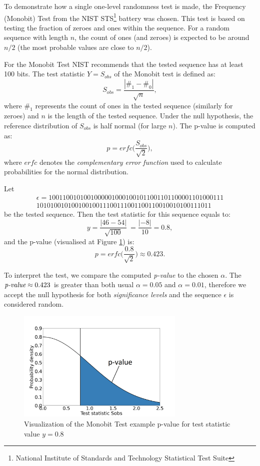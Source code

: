\documentclass[
  digital,     %
  oneside,     %
  nosansbold,  %
  nocolorbold, %
  nolof,         %
  nolot,         %
]{fithesis4}
\begin{document}
To demonstrate how a single one-level randomness test is made, the Frequency (Monobit) Test \cite[p. 2-2]{nist_special} from the NIST STS\footnote{National Institute of Standards and Technology Statistical Test Suite}  battery was chosen. This test is based on testing the fraction of zeroes and ones within the sequence. For a random sequence with length $n$, the count of ones (and zeroes) is expected to be around $n/2$ (the most probable values are close to $n/2$). 

For the Monobit Test NIST recommends that the tested sequence has at least 100 bits. The test statistic $Y=S_{obs}$ of the Monobit test is defined as:
\[S_{obs} = \dfrac{|\#_1 - \#_0|}{\sqrt{n}},\]
where $\#_1$ represents the count of ones in the tested sequence (similarly for zeroes) and $n$ is the length of the tested sequence. Under the null hypothesis, the reference distribution of $S_{obs}$ is half normal (for large $n$). The p-value is computed as:
\[ p = erfc\biggl(\dfrac{S_{obs}}{\sqrt{2}}\biggr),\]
where $erfc$ denotes the \emph{complementary error function} used to calculate probabilities for the normal distribution.

 Let
\[\begin{split}
    \epsilon = 10011001010010000010001001011001101100001101000111\\10101001010010010011100111001100110010010100111011
\end{split}\]
 be the tested sequence. Then the test statistic for this sequence equals to:
 \[y = \dfrac{|46 - 54|}{\sqrt{100}}\ = \dfrac{|-8|}{10} = 0.8,\]
 and the p-value (visualised at Figure \ref{fig:example}) is: 
 \[p = erfc\biggl(\dfrac{0.8}{\sqrt{2}}\biggr) \approx 0.423.\]

To interpret the test, we compare the computed \emph{p-value} to the chosen $\alpha$. The $\emph{p-value} \approx 0.423$ is greater than both usual $\alpha = 0.05$ and $\alpha = 0.01$, therefore we accept the null hypothesis for both \emph{significance levels} and the sequence $\epsilon$ is considered random.

\begin{figure}[H]
  \begin{center}
    \includegraphics[width=8cm]{figures/test_example.png}
  \end{center}
  \caption{Visualization of the Monobit Test example p-value for test statistic value $y = 0.8$}
  \label{fig:example}
\end{figure}
\end{document}
